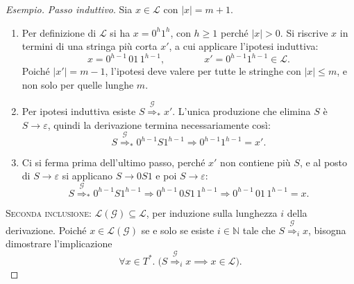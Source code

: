 \documentclass[a4paper, 11pt, oneside]{book}
\theoremstyle{formale}
\newenvironment{esempio}
    {\begin{proof}[\textit{Esempio}]\renewcommand{\qedsymbol}{$\diamond$}}
    {\end{proof}}
\begin{document}
\begin{esempio}
        \textit{Passo induttivo}. Sia $x \in \mathcal{L}$ con $|x| = m + 1$.
        \begin{enumerate}
            \item Per definizione di $\mathcal{L}$ si ha $x = 0^h 1^h$, con $h \geq 1$
                perch\'e $|x| > 0$. Si riscrive $x$ in termini di una stringa pi\`u corta
                $x'$, a cui applicare l'ipotesi induttiva:
                \begin{equation*}
                    x = 0^{h-1} \, 01 \, 1^{h-1},
                    \qquad\qquad
                    x' = 0^{h-1} 1^{h-1} \in \mathcal{L}.
                \end{equation*}
                Poich\'e $|x'| = m - 1$, l'ipotesi deve valere per tutte le stringhe con
                $|x| \leq m$, e non solo per quelle lunghe $m$.
            \item Per ipotesi induttiva esiste $S \overset{\mathcal{G}}{\Rightarrow}_* x'$.
                L'unica produzione che elimina $S$ \`e $S \to \varepsilon$, quindi la
                derivazione termina necessariamente cos\`i:
                \begin{equation*}
                    S \overset{\mathcal{G}}{\Rightarrow}_* 0^{h-1} S 1^{h-1}
                    \Rightarrow 0^{h-1} 1^{h-1} = x'.
                \end{equation*}
            \item Ci si ferma prima dell'ultimo passo, perch\'e $x'$ non contiene pi\`u $S$,
                e al posto di $S \to \varepsilon$ si applicano $S \to 0S1$ e poi
                $S \to \varepsilon$:
                \begin{equation*}
                    S \overset{\mathcal{G}}{\Rightarrow}_* 0^{h-1} S 1^{h-1}
                    \Rightarrow 0^{h-1} \, 0S1 \, 1^{h-1}
                    \Rightarrow 0^{h-1} \, 01 \, 1^{h-1} = x.
                \end{equation*}
        \end{enumerate}

        \medskip
        \noindent\textsc{Seconda inclusione}: $\mathcal{L}(\mathcal{G}) \subseteq
        \mathcal{L}$, per induzione sulla lunghezza $i$ della derivazione. Poich\'e
        $x \in \mathcal{L}(\mathcal{G})$ se e solo se esiste $i \in \mathbb{N}$ tale che
        $S \overset{\mathcal{G}}{\Rightarrow}_i x$, bisogna dimostrare l'implicazione
        \begin{equation*}
            \forall x \in T^*.\;
            \bigl(S \overset{\mathcal{G}}{\Rightarrow}_i x \implies x \in \mathcal{L}\bigr).
        \end{equation*}


\end{esempio}
\end{document}
